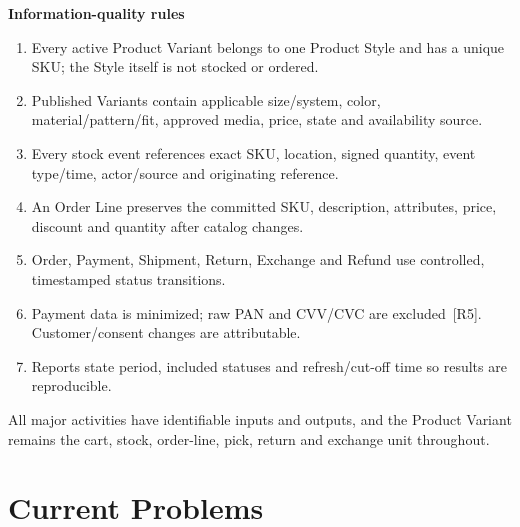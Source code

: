 \documentclass[10pt,a4paper]{article}
\begin{document}
\normalsize\textbf{Information-quality rules}
\begin{enumerate}
\item Every active Product Variant belongs to one Product Style and has a unique SKU; the Style itself is not stocked or ordered.
\item Published Variants contain applicable size/system, color, material/pattern/fit, approved media, price, state and availability source.
\item Every stock event references exact SKU, location, signed quantity, event type/time, actor/source and originating reference.
\item An Order Line preserves the committed SKU, description, attributes, price, discount and quantity after catalog changes.
\item Order, Payment, Shipment, Return, Exchange and Refund use controlled, timestamped status transitions.
\item Payment data is minimized; raw PAN and CVV/CVC are excluded~[R5]. Customer/consent changes are attributable.
\item Reports state period, included statuses and refresh/cut-off time so results are reproducible.
\end{enumerate}

All major activities have identifiable inputs and outputs, and the Product Variant remains the cart, stock, order-line, pick, return and exchange unit throughout.
\newpage

\section{Current Problems}
\end{document}
